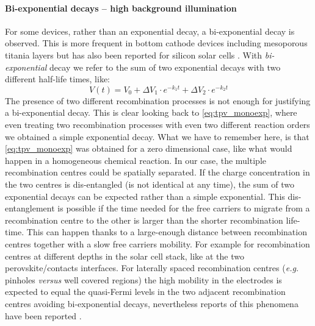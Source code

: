 	\paragraph{Bi-exponential decays -- high background illumination}
	For some devices, rather than an exponential decay, a bi-exponential decay is observed.
	This is more frequent in bottom cathode devices including mesoporous titania layers \cite{Carnie2015,ORegan2015b} but has also been reported for silicon solar cells \cite{Kiermasch2018}.
	With \emph{bi-exponential} decay we refer to the sum of two exponential decays with two different half-life times, like:
	\begin{equation}\label{eq:tpv_biexp}
		V (t) = V_0 + \Delta V_1 \cdot e^{-k_1t} + \Delta V_2 \cdot e^{-k_2t}
	\end{equation}
	The presence of two different recombination processes is not enough for justifying a bi-exponential decay.
	This is clear looking back to \cref{eq:tpv_monoexp}, where even treating two recombination processes with even two different reaction orders we obtained a simple exponential decay.
	What we have to remember here, is that \cref{eq:tpv_monoexp} was obtained for a zero dimensional case, like what would happen in a homogeneous chemical reaction.
	In our case, the multiple recombination centres could be spatially separated.
	If the charge concentration in the two centres is dis-entangled (is not identical at any time), the sum of two exponential decays can be expected rather than a simple exponential.
	This dis-entanglement is possible if the time needed for the free carriers to migrate from a recombination centre to the other is larger than the shorter recombination life-time.
	This can happen thanks to a large-enough distance between recombination centres together with a slow free carriers mobility.
	For example for recombination centres at different depths in the solar cell stack, like at the two perovskite/contacts interfaces.
	For laterally spaced recombination centres (\textit{e.g.} pinholes \textit{versus} well covered regions) the high mobility in the electrodes is expected to equal the quasi-Fermi levels in the two adjacent recombination centres avoiding bi-exponential decays, nevertheless reports of this phenomena have been reported \cite{Montcada2017}.

